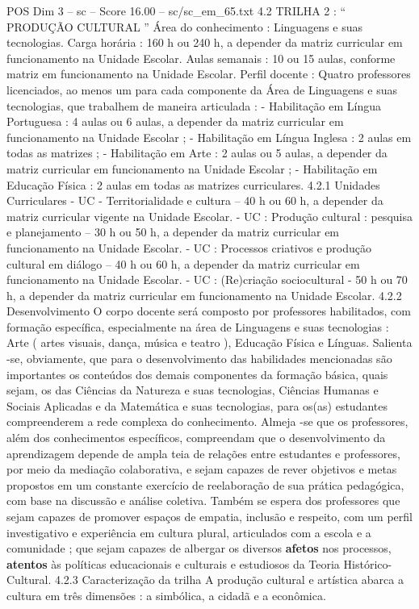 \begin{textsample}{POS Dim 3 – sc – Score 16.00 – sc/sc\_em\_65.txt}  \label{ex:f3_pos_070}
4.2 TRILHA 2 : “ PRODUÇÃO CULTURAL ” Área do conhecimento : Linguagens e suas tecnologias.
Carga horária : 160 h ou 240 h, a depender da matriz curricular em funcionamento na Unidade Escolar.
Aulas semanais : 10 ou 15 aulas, conforme matriz em funcionamento na Unidade Escolar.
Perfil docente : Quatro professores licenciados, ao menos um para cada componente da Área de Linguagens e suas tecnologias, que trabalhem de maneira articulada : - Habilitação em Língua Portuguesa : 4 aulas ou 6 aulas, a depender da matriz curricular em funcionamento na Unidade Escolar ; - Habilitação em Língua Inglesa : 2 aulas em todas as matrizes ; - Habilitação em Arte : 2 aulas ou 5 aulas, a depender da matriz curricular em funcionamento na Unidade Escolar ; - Habilitação em Educação Física : 2 aulas em todas as matrizes curriculares. 4.2.1 Unidades Curriculares - UC - Territorialidade e cultura – 40 h ou 60 h, a depender da matriz curricular vigente na Unidade Escolar. - UC : Produção cultural : pesquisa e planejamento – 30 h ou 50 h, a depender da matriz curricular em funcionamento na Unidade Escolar. - UC : Processos criativos e produção cultural em diálogo – 40 h ou 60 h, a depender da matriz curricular em funcionamento na Unidade Escolar. - UC : (Re)criação sociocultural - 50 h ou 70 h, a depender da matriz curricular em funcionamento na Unidade Escolar. 4.2.2 Desenvolvimento O corpo docente será composto por professores habilitados, com formação específica, especialmente na área de Linguagens e suas tecnologias : Arte ( artes visuais, dança, música e teatro ), Educação Física e Línguas.
Salienta -se, obviamente, que para o desenvolvimento das habilidades mencionadas são importantes os conteúdos dos demais componentes da formação básica, quais sejam, os das Ciências da Natureza e suas tecnologias, Ciências Humanas e Sociais Aplicadas e da Matemática e suas tecnologias, para os(as) estudantes compreenderem a rede complexa do conhecimento.
Almeja -se que os professores, além dos conhecimentos específicos, compreendam que o desenvolvimento da aprendizagem depende de ampla teia de relações entre estudantes e professores, por meio da mediação colaborativa, e sejam capazes de rever objetivos e metas propostos em um constante exercício de reelaboração de sua prática pedagógica, com base na discussão e análise coletiva.
Também se espera dos professores que sejam capazes de promover espaços de empatia, inclusão e respeito, com um perfil investigativo e experiência em cultura plural, articulados com a escola e a comunidade ; que sejam capazes de albergar os diversos \textbf{afetos} nos processos, \textbf{atentos} às políticas educacionais e culturais e estudiosos da Teoria Histórico-Cultural. 4.2.3 Caracterização da trilha A produção cultural e artística abarca a cultura em três dimensões : a simbólica, a cidadã e a econômica.

\end{textsample}
